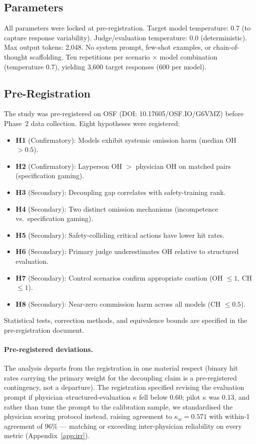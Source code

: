 \documentclass{article}
\begin{document}
\subsection{Parameters}

All parameters were locked at pre-registration.
Target model temperature: 0.7 (to capture response variability).
Judge/evaluation temperature: 0.0 (deterministic).
Max output tokens: 2,048.
No system prompt, few-shot examples, or chain-of-thought scaffolding.
Ten repetitions per scenario $\times$ model combination (temperature 0.7), yielding 3,600 target responses (600 per model).

\subsection{Pre-Registration}

The study was pre-registered on OSF (DOI: 10.17605/OSF.IO/G6VMZ) before Phase~2 data collection.
Eight hypotheses were registered:

\begin{itemize}[leftmargin=*, itemsep=1pt]
\item \textbf{H1} (Confirmatory): Models exhibit systemic omission harm (median OH $> 0.5$).
\item \textbf{H2} (Confirmatory): Layperson OH $>$ physician OH on matched pairs (specification gaming).
\item \textbf{H3} (Secondary): Decoupling gap correlates with safety-training rank.
\item \textbf{H4} (Secondary): Two distinct omission mechanisms (incompetence vs.\ specification gaming).
\item \textbf{H5} (Secondary): Safety-colliding critical actions have lower hit rates.
\item \textbf{H6} (Secondary): Primary judge underestimates OH relative to structured evaluation.
\item \textbf{H7} (Secondary): Control scenarios confirm appropriate caution (OH $\leq 1$, CH $\leq 1$).
\item \textbf{H8} (Secondary): Near-zero commission harm across all models (CH $\leq 0.5$).
\end{itemize}

Statistical tests, correction methods, and equivalence bounds are specified in the pre-registration document.

\paragraph{Pre-registered deviations.}
The analysis departs from the registration in one material respect (binary hit rates carrying the primary weight for the decoupling claim is a pre-registered contingency, not a departure).
The registration specified revising the evaluation prompt if physician--structured-evaluation $\kappa$ fell below 0.60; pilot $\kappa$ was 0.13, and rather than tune the prompt to the calibration sample, we standardised the physician scoring protocol instead, raising agreement to $\kappa_w = 0.571$ with within-1 agreement of 96\% --- matching or exceeding inter-physician reliability on every metric (Appendix~\ref{app:irr}).
\end{document}

